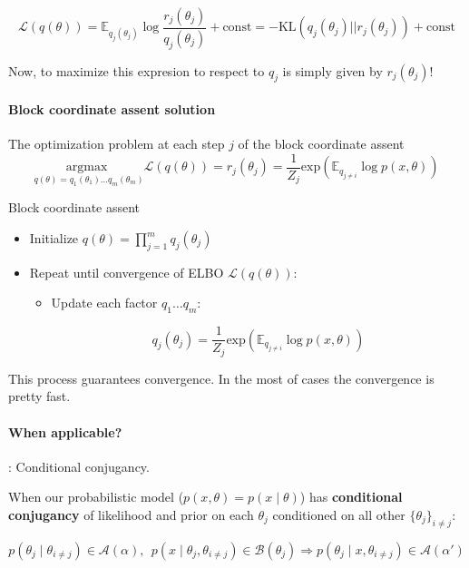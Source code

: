  \begin{equation}
  \mathcal{L}(q(\theta)) =  \mathbb{E}_{q_j(\theta_j)} \log \frac{r_j(\theta_j)}{q_j(\theta_j)} +  \text{const} = - \text{KL}(q_j(\theta_j)||r_j(\theta_j)) +  \text{const} 
 \end{equation}
 
 Now, to maximize this expresion to respect to $q_j$ is simply given by $r_j(\theta_j)$!
 
 \begin{framed}
 \paragraph{Block coordinate assent solution}
 The optimization problem at each step $j$ of the block coordinate assent
 \begin{equation}
\underset{q(\theta) = q_1(\theta_1) \dots q_m(\theta_m) }{\text{argmax }} \mathcal{L}(q(\theta))   = r_j(\theta_j) = \frac{1}{Z_j} \text{exp}(\mathbb{E}_{q_{j\neq i}} \log p(x,\theta))
 \end{equation} 
 \end{framed}

 \begin{algorithm}
    \caption{Block coordinate assent}
    \label{alg:blockCoordinateAssent}
    \begin{itemize}
    \item Initialize $q(\theta) = \prod_{j=1}^m q_j(\theta_j)$ 
    \item Repeat until convergence of ELBO $\mathcal{L}(q(\theta))$:

        \begin{itemize}
        \item Update each factor $q_1 \dots q_m$:
        
        \[q_j(\theta_j)= \frac{1}{Z_j} \text{exp}(\mathbb{E}_{q_{j\neq i}} \log p(x,\theta))\]
        
        
        
        \end{itemize}
    \end{itemize}
\end{algorithm}

This process guarantees convergence.
In the most of cases the convergence is pretty fast.


\begin{framed}
 \paragraph{When applicable?}: Conditional conjugancy.
 
 When our probabilistic model ($p(x,\theta) = p(x \mid \theta)$) has \textbf{conditional conjugancy} of likelihood and prior on each $\theta_j$ conditioned on all other $\{\theta_j\}_{i\neq j}$:
 
 \begin{equation*}
  p(\theta_j \mid \theta_{i\neq j}) \in \mathcal{A}(\alpha), \ \ p(x \mid \theta_j, \theta_{i\neq j}) \in \mathcal{B}(\theta_j) \Rightarrow p(\theta_j \mid x, \theta_{i\neq j}) \in \mathcal{A}(\alpha\prime)
 \end{equation*}
\end{framed}

